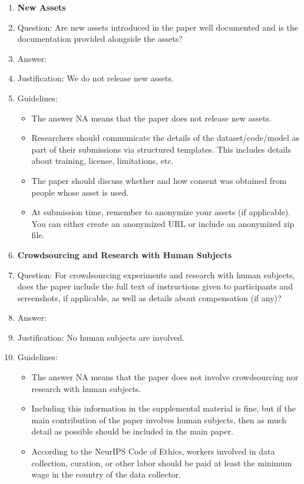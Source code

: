 \documentclass{article}
\begin{document}
\begin{enumerate}
\item {\bf New Assets}
    \item[] Question: Are new assets introduced in the paper well documented and is the documentation provided alongside the assets?
    \item[] Answer: \answerNA{} %
    \item[] Justification: We do not release new assets.
    \item[] Guidelines:
    \begin{itemize}
        \item The answer NA means that the paper does not release new assets.
        \item Researchers should communicate the details of the dataset/code/model as part of their submissions via structured templates. This includes details about training, license, limitations, etc. 
        \item The paper should discuss whether and how consent was obtained from people whose asset is used.
        \item At submission time, remember to anonymize your assets (if applicable). You can either create an anonymized URL or include an anonymized zip file.
    \end{itemize}

\item {\bf Crowdsourcing and Research with Human Subjects}
    \item[] Question: For crowdsourcing experiments and research with human subjects, does the paper include the full text of instructions given to participants and screenshots, if applicable, as well as details about compensation (if any)? 
    \item[] Answer: \answerNA{} %
    \item[] Justification: No human subjects are involved.
    \item[] Guidelines:
    \begin{itemize}
        \item The answer NA means that the paper does not involve crowdsourcing nor research with human subjects.
        \item Including this information in the supplemental material is fine, but if the main contribution of the paper involves human subjects, then as much detail as possible should be included in the main paper. 
        \item According to the NeurIPS Code of Ethics, workers involved in data collection, curation, or other labor should be paid at least the minimum wage in the country of the data collector. 
    \end{itemize}


\end{enumerate}
\end{document}
